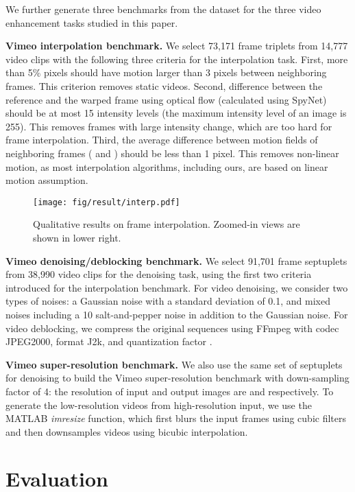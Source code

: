 \documentclass[twocolumn,natbib]{svjour3}          \smartqed  \usepackage{graphicx}
\def\denoisingbenchmark{Vimeo denoising/deblocking benchmark\xspace}
\def\srbenchmark{Vimeo super-resolution benchmark\xspace}
\def\interpbenchmark{Vimeo interpolation benchmark\xspace}
\newcommand{\myparagraph}[1]{\vspace{5pt}\noindent\textbf{#1}}
\begin{document}
We further generate three benchmarks from the dataset for the three video enhancement tasks studied in this paper. 

\myparagraph{\interpbenchmark. }
We select 73,171 frame triplets from 14,777 video clips with the following three criteria for the interpolation task. First, more than 5\% pixels should have motion larger than 3 pixels between neighboring frames. This criterion removes static videos. 
Second,  difference between the reference and the warped frame using optical flow (calculated using SpyNet) should be at most 15 intensity levels (the maximum intensity level of an image is 255). This removes frames with large intensity change, which are too hard for frame interpolation. Third, the average difference between motion fields of neighboring frames ( and ) should be less than 1 pixel. This removes non-linear motion, as most interpolation algorithms, including ours, are based on linear motion assumption. 

\begin{figure*}[t]
    \centering
    \texttt{[image: fig/result/interp.pdf]}
\caption{Qualitative results on frame interpolation. Zoomed-in views are shown in lower right.}
    \label{fig:interp}
\end{figure*}

 
\myparagraph{\denoisingbenchmark. }
We select 91,701 frame septuplets from 38,990 video clips for the denoising task, using the first two criteria introduced for the interpolation benchmark. 
For video denoising, we consider two types of noises: a Gaussian noise with a standard deviation of 0.1, and mixed noises including a 10 salt-and-pepper noise in addition to the Gaussian noise. For video deblocking, we compress the original sequences using FFmpeg with codec JPEG2000, format J2k, and quantization factor .

\myparagraph{\srbenchmark. } We also use the same set of septuplets for denoising to build the \srbenchmark with down-sampling factor of 4: the resolution of input and output images are  and  respectively. To generate the low-resolution videos from high-resolution input, we use the MATLAB \textit{imresize} function, which first blurs the input frames using cubic filters and then downsamples videos using bicubic interpolation.
 
\section{Evaluation}
\label{sec:eval}
\end{document}
